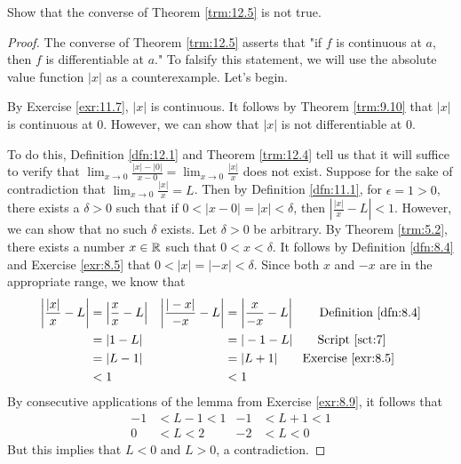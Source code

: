 \documentclass[../main.tex]{subfiles}
\begin{document}
\begin{exercise}\label{exr:12.6}
    Show that the converse of Theorem \ref{trm:12.5} is not true.
    \begin{proof}

        The converse of Theorem \ref{trm:12.5} asserts that "if $f$ is continuous at $a$, then $f$ is differentiable at $a$." To falsify this statement, we will use the absolute value function $|x|$ as a counterexample. Let's begin.\par
        By Exercise \ref{exr:11.7}, $|x|$ is continuous. It follows by Theorem \ref{trm:9.10} that $|x|$ is continuous at 0. However, we can show that $|x|$ is not differentiable at 0.\par
        To do this, Definition \ref{dfn:12.1} and Theorem \ref{trm:12.4} tell us that it will suffice to verify that $\lim_{x\to 0}\frac{|x|-|0|}{x-0}=\lim_{x\to 0}\frac{|x|}{x}$ does not exist. Suppose for the sake of contradiction that $\lim_{x\to 0}\frac{|x|}{x}=L$. Then by Definition \ref{dfn:11.1}, for $\epsilon=1>0$, there exists a $\delta>0$ such that if $0<|x-0|=|x|<\delta$, then $|\frac{|x|}{x}-L|<1$. However, we can show that no such $\delta$ exists. Let $\delta>0$ be arbitrary. By Theorem \ref{trm:5.2}, there exists a number $x\in\mathbb{R}$ such that $0<x<\delta$. It follows by Definition \ref{dfn:8.4} and Exercise \ref{exr:8.5} that $0<|x|=|-x|<\delta$. Since both $x$ and $-x$ are in the appropriate range, we know that
        \begin{align*}
            \left| \frac{|x|}{x}-L \right| &= \left| \frac{x}{x}-L \right|&
                \left| \frac{|-x|}{-x}-L \right| &= \left| \frac{x}{-x}-L \right|\tag*{Definition \ref{dfn:8.4}}\\
            &= |1-L|&
                &= |-1-L|\tag*{Script \ref{sct:7}}\\
            &= |L-1|&
                &= |L+1|\tag*{Exercise \ref{exr:8.5}}\\
            &< 1&
                &< 1
        \end{align*}
        By consecutive applications of the lemma from Exercise \ref{exr:8.9}, it follows that
        \begin{align*}
            -1 &< L-1 < 1&
                -1 &< L+1 < 1\\
            0 &< L < 2&
                -2 &< L < 0
        \end{align*}
        But this implies that $L<0$ and $L>0$, a contradiction.
    \end{proof}
\end{exercise}
\end{document}

